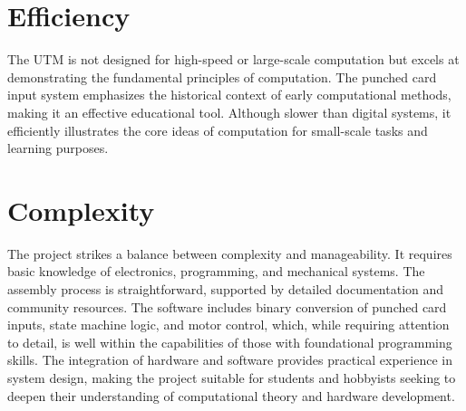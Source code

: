 \section{Efficiency}

The UTM is not designed for high-speed or large-scale computation but excels at demonstrating the fundamental principles of computation. The punched card input system emphasizes the historical context of early computational methods, making it an effective educational tool. Although slower than digital systems, it efficiently illustrates the core ideas of computation for small-scale tasks and learning purposes.

\section{Complexity}

The project strikes a balance between complexity and manageability. It requires basic knowledge of electronics, programming, and mechanical systems. The assembly process is straightforward, supported by detailed documentation and community resources. The software includes binary conversion of punched card inputs, state machine logic, and motor control, which, while requiring attention to detail, is well within the capabilities of those with foundational programming skills. The integration of hardware and software provides practical experience in system design, making the project suitable for students and hobbyists seeking to deepen their understanding of computational theory and hardware development.